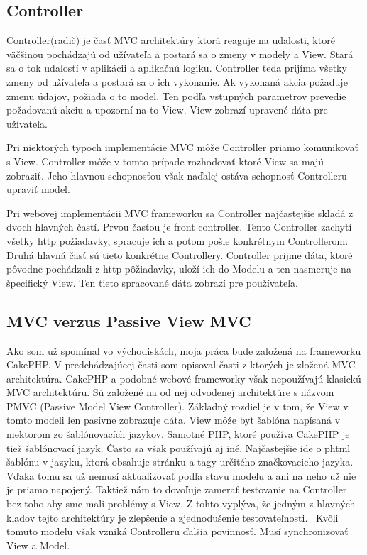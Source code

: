 \documentclass[12pt]{book}
\begin{document}
\subsection{Controller}
Controller(radič) je časť MVC architektúry ktorá reaguje na udalosti, ktoré väčšinou pochádzajú od užívateľa a postará sa o zmeny v modely a View.  Stará sa o tok udalostí v aplikácii a aplikačnú logiku. Controller teda prijíma všetky zmeny od užívateľa a postará sa o ich vykonanie. Ak vykonaná akcia požaduje zmenu údajov, požiada o to model. Ten podľa vstupných parametrov prevedie požadovanú akciu a upozorní na to View. View zobrazí upravené dáta pre užívateľa.

Pri niektorých typoch implementácie MVC môže Controller priamo komunikovať s View. Controller môže v tomto prípade rozhodovať ktoré View sa majú zobraziť. Jeho hlavnou schopnosťou však naďalej ostáva schopnosť Controlleru upraviť model.

Pri webovej implementácii MVC frameworku sa Controller najčastejšie skladá z dvoch hlavných častí. Prvou časťou je front controller. Tento Controller zachytí všetky http požiadavky, spracuje ich a potom pošle konkrétnym Controllerom. Druhá hlavná časť sú tieto konkrétne Controllery. Controller prijme dáta, ktoré pôvodne pochádzali z http pôžiadavky, uloží ich do Modelu a ten nasmeruje na špecifický View. Ten tieto spracované dáta zobrazí pre používateľa.

\subsection{MVC verzus Passive View MVC}
Ako som už spomínal vo východiskách, moja práca bude založená na frameworku CakePHP. V predchádzajúcej časti som opisoval časti z ktorých je zložená MVC architektúra. CakePHP a podobné webové frameworky však nepoužívajú klasickú MVC architektúru. Sú založené na od nej odvodenej architektúre s názvom PMVC (Passive Model View Controller). Základný rozdiel je v tom, že View v tomto modeli len pasívne zobrazuje dáta. View môže byť šablóna napísaná v niektorom zo šablónovacích jazykov. Samotné PHP, ktoré používa CakePHP je tiež šablónovací jazyk. Často sa však používajú aj iné. Najčastejšie ide o phtml šablónu v jazyku, ktorá obsahuje stránku a tagy určitého značkovacieho jazyka. Vďaka tomu sa už nemusí aktualizovať podľa stavu modelu a ani na neho už nie je priamo napojený. Taktiež nám to dovoľuje zamerať testovanie na Controller bez toho aby sme mali problémy s View. Z tohto vyplýva, že jedným z hlavných kladov tejto architektúry je zlepšenie a zjednodušenie testovateľnosti. \cite{PMVC}\  Kvôli tomuto modelu však vzniká Controlleru ďalšia povinnosť. Musí synchronizovať View a Model. 
\end{document}
